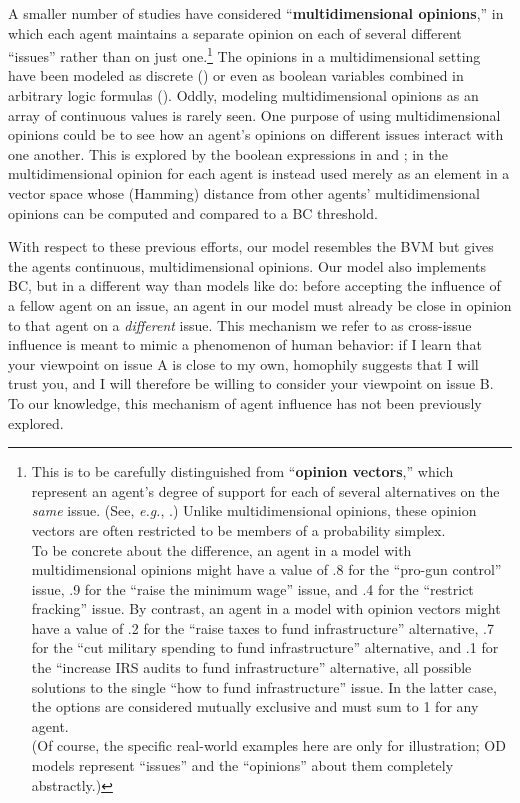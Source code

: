A smaller number of studies have considered ``\textbf{multidimensional
opinions},'' in which each agent maintains a separate opinion on each of
several different ``issues'' rather than on just one.\footnote{This is to be
carefully distinguished from ``\textbf{opinion vectors},'' which represent an
agent's degree of support for each of several alternatives on the \textit{same}
issue. (See, \textit{e.g.}, \cite{sirbu_opinion_2013}.) Unlike multidimensional
opinions, these opinion vectors are often restricted to be members of a
probability simplex.\\\indent To be concrete about the difference, an agent in
a model with multidimensional opinions might have a value of .8 for the
``pro-gun control'' issue, .9 for the ``raise the minimum wage'' issue, and .4
for the ``restrict fracking'' issue. By contrast, an agent in a model with
opinion vectors might have a value of .2 for the ``raise taxes to fund
infrastructure'' alternative, .7 for the ``cut military spending to fund
infrastructure'' alternative, and .1 for the ``increase IRS audits to fund
infrastructure'' alternative, all possible solutions to the single ``how to
fund infrastructure'' issue. In the latter case, the options are considered
mutually exclusive and must sum to 1 for any agent.\\\indent (Of course, the
specific real-world examples here are only for illustration; OD models
represent ``issues'' and the ``opinions'' about them completely abstractly.)}
The opinions in a multidimensional setting have been modeled as discrete
(\cite{deffuant_mixing_2000}) or even as boolean variables combined in
arbitrary logic formulas (\cite{van_den_herik_modelling_2019,
cholvy_diffusion_2016}). Oddly, modeling multidimensional opinions as an array
of continuous values is rarely seen. One purpose of using multidimensional
opinions could be to see how an agent's opinions on different issues interact
with one another. This is explored by the boolean expressions in
\cite{van_den_herik_modelling_2019} and \cite{cholvy_diffusion_2016}; in
\cite{deffuant_mixing_2000} the multidimensional opinion for each agent is
instead used merely as an element in a vector space whose (Hamming) distance
from other agents' multidimensional opinions can be computed and compared to a
BC threshold.

With respect to these previous efforts, our model resembles the BVM but gives
the agents continuous, multidimensional opinions. Our model also implements BC, but in
a different way than models like \cite{tsang_opinion_2014} do: before accepting
the influence of a fellow agent on an issue, an agent in our model must already
be close in opinion to that agent on a \textit{different} issue. This mechanism we refer to as  
cross-issue influence is meant to mimic a phenomenon of human behavior: if I learn that your viewpoint on
issue A is close to my own, homophily suggests that I will trust you, and I
will therefore be willing to consider your viewpoint on issue B. To our
knowledge, this mechanism of agent influence has not been previously explored.

